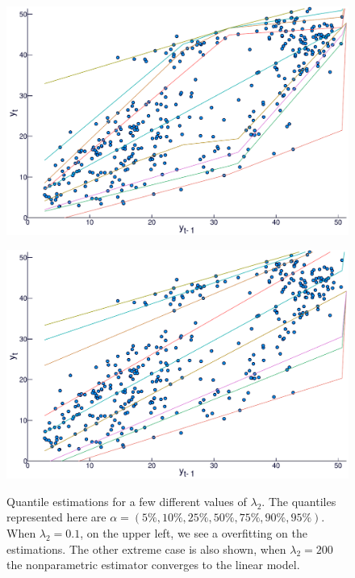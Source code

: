 \begin{figure}[htp]
\begin{minipage}[t]{0.4\linewidth}
\begin{minipage}[b]{\linewidth}
      \centering     \includegraphics[width=\textwidth]{Images/icaraizinho-crossing-10}
    \end{minipage}
     \begin{minipage}[b]{\linewidth}
      \centering     \includegraphics[width=\textwidth]{Images/icaraizinho-crossing-200}
      \label{fig:npqar-cross}
     \end{minipage}
  \end{minipage}
  \caption{Quantile estimations for a few different values of $\lambda_2$. The quantiles represented here are $\alpha = (5\%, 10\%, 25\%, 50\%, 75\%, 90\%, 95\%)$. When $\lambda_2 = 0.1$, on the upper left, we see a overfitting on the estimations. The other extreme case is also shown, when $\lambda_2=200$ the nonparametric estimator converges to the linear model.}
  \label{fig:npqar-results}
\end{figure}



